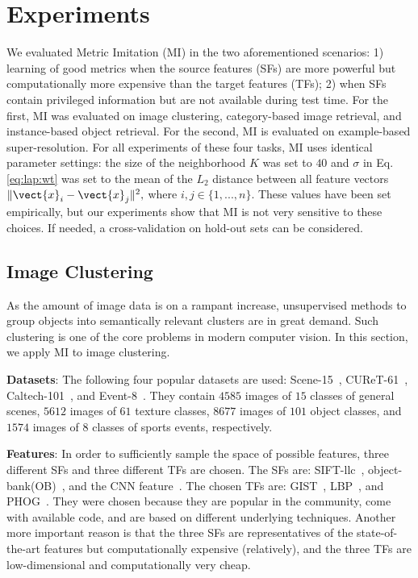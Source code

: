
\section{Experiments} 
\label{sec:exp}

We evaluated Metric Imitation (MI) in the two aforementioned
scenarios: 1) learning of good metrics when the source
features (SFs) are more powerful but computationally more expensive
than the target features (TFs); 2) when SFs contain privileged
information but are not available during test time. For the first, MI
was evaluated on image clustering, category-based image retrieval, and
instance-based object retrieval. For the second, MI is evaluated on
example-based super-resolution. For all experiments of these four
tasks, MI uses identical parameter settings: the size of the
neighborhood $K$ was set to $40$ and $\sigma$ in Eq.\ref{eq:lap:wt}
was set to the mean of the $L_2$ distance between all feature vectors $\|
\vect{x}_i - \vect{x}_j \|^2, $ where $i, j \in \{1, ..., n \}$. These
values have been set empirically, but our experiments show that MI is
not very sensitive to these choices. If needed, a cross-validation on
hold-out sets can be considered.



\subsection{Image Clustering}
\label{sec:img:clustering}
As the amount of image data is on a rampant increase, unsupervised 
methods to group objects into semantically relevant clusters are in 
great demand. Such clustering is one of the core problems in modern
computer vision. In this section, we apply MI to image clustering.

\textbf{Datasets}: The following four popular datasets are used:
Scene-15~\citep{lazebnik:cvpr06}, CUReT-61~\citep{CUReT-61},
Caltech-101~\citep{FeiFei2004}, and Event-8~\citep{event8}. They contain
$4585$ images of $15$ classes of general scenes, $5612$ images of $61$
texture classes, $8677$ images of $101$ object classes, and $1574$
images of $8$ classes of sports events, respectively.

\textbf{Features}: In order to sufficiently sample the space of
possible features, three different SFs and three different TFs are
chosen. The SFs are: SIFT-llc~\citep{siftllc:cvpr10},
object-bank(OB)~\citep{objectbank:nips10}, and the CNN
feature~\citep{deep:bmvc14}. The chosen TFs are: GIST~\citep{gist},
LBP~\citep{lbp}, and PHOG~\citep{phog}. They were chosen because they
are popular in the community, come with available code, and are based
on different underlying techniques. Another more important reason is
that the three SFs are representatives of the state-of-the-art
features but computationally expensive (relatively), and the three TFs
are low-dimensional and computationally very cheap.


